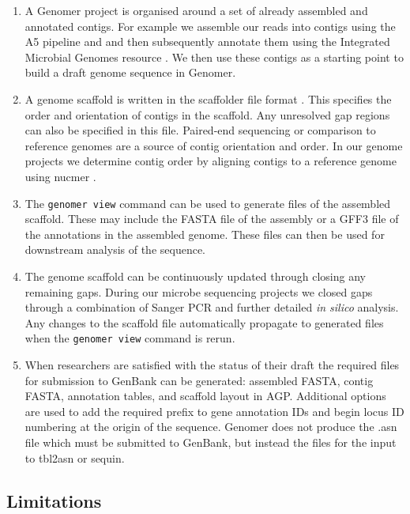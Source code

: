 \documentclass[10pt]{article}
\begin{document}
\begin{enumerate}

  \item{A Genomer project is organised around a set of already assembled and
  annotated contigs. For example we assemble our reads into contigs using the
  A5 pipeline \cite{tritt2012} and and then subsequently annotate them using
  the Integrated Microbial Genomes resource \cite{markowitz2006}. We then use
  these contigs as a starting point to build a draft genome sequence in
  Genomer.}

  \item{A genome scaffold is written in the scaffolder file format
  \cite{barton2012}. This specifies the order and orientation of contigs in the
  scaffold. Any unresolved gap regions can also be specified in this file.
  Paired-end sequencing or comparison to reference genomes are a source of
  contig orientation and order. In our genome projects we determine contig
  order by aligning contigs to a reference genome using nucmer
  \cite{kurtz2004}.}

  \item{The \verb+genomer view+ command can be used to generate files of the
  assembled scaffold. These may include the FASTA file of the assembly or a
  GFF3 file of the annotations in the assembled genome. These files can then be
  used for downstream analysis of the sequence.}

  \item{The genome scaffold can be continuously updated through closing any
  remaining gaps. During our microbe sequencing projects we closed gaps through
  a combination of Sanger PCR and further detailed \emph{in silico} analysis.
  Any changes to the scaffold file automatically propagate to generated files
  when the \verb+genomer view+ command is rerun.}

  \item{When researchers are satisfied with the status of their draft the
  required files for submission to GenBank can be generated: assembled FASTA,
  contig FASTA, annotation tables, and scaffold layout in AGP. Additional
  options are used to add the required prefix to gene annotation IDs and begin
  locus ID numbering at the origin of the sequence. Genomer does not produce
  the .asn file which must be submitted to GenBank, but instead the files for
  the input to tbl2asn or sequin. }

\end{enumerate}

\subsection*{Limitations}
\end{document}
